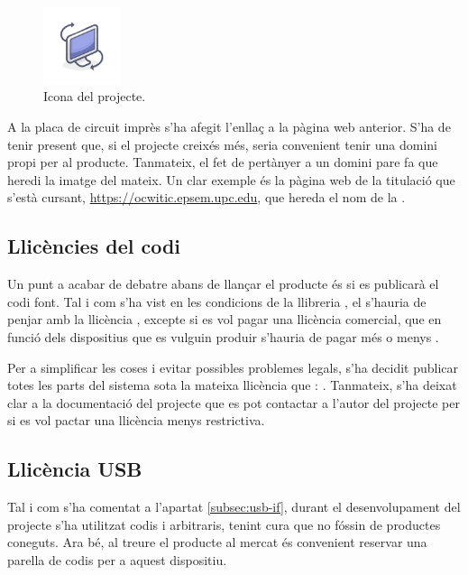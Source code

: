 \begin{figure}[ht]
    \centering
    \includegraphics[width=0.2\textwidth]{images/gyroscreen.png}
    \caption{Icona del projecte.}
    \label{fig:icon}
\end{figure}

A la placa de circuit imprès s'ha afegit l'enllaç a la pàgina web anterior.
S'ha de tenir present que, si el projecte creixés més, seria convenient tenir
una domini propi per al producte. Tanmateix, el fet de pertànyer a un domini
pare fa que heredi la imatge del mateix. Un clar exemple és la pàgina web de
la titulació que s'està cursant, \url{https://ocwitic.epsem.upc.edu}, que
hereda el nom de la .

\subsection{Llicències del codi}

Un punt a acabar de debatre abans de llançar el producte és si es publicarà el
codi font. Tal i com s'ha vist en les condicions de la llibreria , el
 s'hauria de penjar amb la llicència , excepte si es
vol pagar una llicència comercial, que en funció dels dispositius que es vulguin
produir s'hauria de pagar més o menys \cite{VusbLicensing}.

Per a simplificar les coses i evitar possibles problemes legals, s'ha decidit
publicar totes les parts del sistema sota la mateixa llicència que :
. Tanmateix, s'ha deixat clar a la documentació del projecte que
es pot contactar a l'autor del projecte per si es vol pactar una llicència menys
restrictiva.

\subsection{Llicència USB}

Tal i com s'ha comentat a l'apartat \ref{subsec:usb-if}, durant el desenvolupament
del projecte s'ha utilitzat codis  i  arbitraris, tenint
cura que no fóssin de productes coneguts. Ara bé, al treure el producte al
mercat és convenient reservar una parella de codis per a aquest dispositiu.

